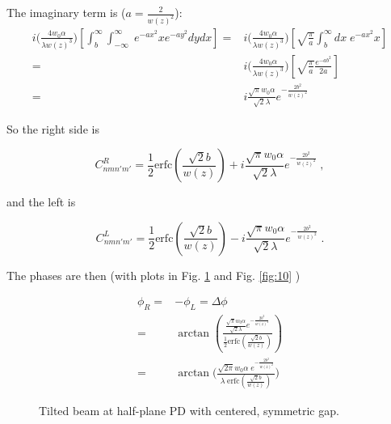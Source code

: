 \documentclass[aps,twoside,secnumarabic,balancelastpage,amsmath,amssymb,nofootinbib,hyperref=pdftex]{revtex4}
\newcommand{\bigfrac}[2]{\Big( \frac{#1}{#2}\Big)}
\begin{document}
The imaginary term is ($a = \frac{2}{w(z)^2}$):
\begin{align*}
i  \bigfrac{ 4 w_{0} \alpha}{\lambda w(z)^3}
		\left[
		\int_{b}^{\infty} \int_{-\infty}^{\infty}  \; e^{-a 		x^2}x e^{-a y^2} dydx \right]
=&
	i  \bigfrac{ 4 w_{0} \alpha}{\lambda w(z)^3}
	\left[
	\sqrt{\frac{\pi}{a}}
\int_{b}^{\infty} dx\; e^{-a x^2}x
\right]
\\=&
i  \bigfrac{ 4 w_{0} \alpha}{\lambda w(z)^3}
\left[
	\sqrt{\frac{\pi}{a}}
	\frac{e^{-ab^2}}{2a}
\right]
\\=&
	i \frac{\sqrt{\pi}w_0 \alpha }{\sqrt{2} \lambda} e^{-\frac{2 b^2}{w(z)^2}}
\end{align*}

So the right side is

\begin{equation}
	C_{nmn'm'}^{R} =
		\frac{1} {2} \text{erfc}(\frac{\sqrt{2} b}{w(z)})
		+
		i \frac{\sqrt{\pi}w_0 \alpha }{\sqrt{2} \lambda} e^{-\frac{2 b^2}{w(z)^2}}
\;,
\end{equation}

and the left is

\begin{equation}
	C_{nmn'm'}^{L} =
		\frac{1} {2} \text{erfc}(\frac{\sqrt{2} b}{w(z)})
		-
		i \frac{\sqrt{\pi}w_0 \alpha }{\sqrt{2} \lambda} e^{-\frac{2 b^2}{w(z)^2}}
\;.
\end{equation}

The phases are then (with plots in Fig. \ref{fig:9} and Fig. \ref{fig:10} )

\begin{align*}
\phi_R =& - \phi_L = \Delta \phi
\\=&
 \arctan ( \frac{\frac{\sqrt{\pi}w_0 \alpha }{\sqrt{2} \lambda} e^{-\frac{2 b^2}{w(z)^2}}}{\frac{1} {2} \text{erfc}(\frac{\sqrt{2} b}{w(z)})})
 \\=&
  \arctan \bigfrac{\sqrt{2\pi} w_0 \alpha \; e^{-\frac{2 b^2}{w(z)^2}}}{ \lambda \; \text{erfc}(\frac{\sqrt{2} b}{w(z)})}
\end{align*}


	\begin{figure}
	\centering
	\caption{Tilted beam at half-plane PD with centered, symmetric gap.}
	\label{fig:9}
	\end{figure}
	
\end{document}
